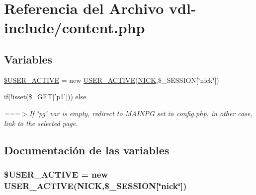 \hypertarget{vdl-include_2content_8php}{\section{Referencia del Archivo vdl-\/include/content.php}
\label{vdl-include_2content_8php}
}
\subsection*{Variables}
\begin{DoxyCompactItemize}
\item 
\hyperlink{vdl-include_2content_8php_ab0978072b4a0a336b6ca785fa4553c59}{\$\-U\-S\-E\-R\-\_\-\-A\-C\-T\-I\-V\-E} = new \hyperlink{classUSER__ACTIVE}{U\-S\-E\-R\-\_\-\-A\-C\-T\-I\-V\-E}(\hyperlink{set__update_8php_abdd850ab3ab0275cf56392a54ffb3af9}{N\-I\-C\-K},\$\-\_\-\-S\-E\-S\-S\-I\-O\-N\mbox{[}\char`\"{}nick\char`\"{}\mbox{]})
\item 
\hyperlink{index_8php_a03ed0eadab502a2cb754ef4963570e97}{if}(!isset(\$\-\_\-\-G\-E\-T\mbox{[}'p1'\mbox{]})) \hyperlink{vdl-include_2content_8php_a93ead46cf0a367ef399d1c95bf036067}{else}
\begin{DoxyCompactList}\small\item\em ===$>$If \char`\"{}pg\char`\"{} var is empty, redirect to M\-A\-I\-N\-P\-G set in config.\-php, in other case, link to the selected page. \end{DoxyCompactList}\end{DoxyCompactItemize}


\subsection{Documentación de las variables}
\hypertarget{vdl-include_2content_8php_ab0978072b4a0a336b6ca785fa4553c59}{
\subsubsection[{\$\-U\-S\-E\-R\-\_\-\-A\-C\-T\-I\-V\-E}]{\setlength{\rightskip}{0pt plus 5cm}\${\bf U\-S\-E\-R\-\_\-\-A\-C\-T\-I\-V\-E} = new {\bf U\-S\-E\-R\-\_\-\-A\-C\-T\-I\-V\-E}({\bf N\-I\-C\-K},\$\-\_\-\-S\-E\-S\-S\-I\-O\-N\mbox{[}\char`\"{}nick\char`\"{}\mbox{]})}}\label{vdl-include_2content_8php_ab0978072b4a0a336b6ca785fa4553c59}


